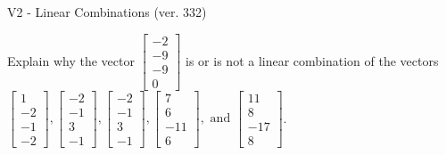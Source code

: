 \begin{exercise}
  \begin{exerciseTitle}V2 - Linear Combinations (ver. 332)\end{exerciseTitle}
  \begin{exerciseStatement}
    Explain why the vector \(\left[\begin{array}{c}
-2 \\
-9 \\
-9 \\
0
\end{array}\right]\)  is or is not a linear 
	combination of the vectors \(\left[\begin{array}{c}
1 \\
-2 \\
-1 \\
-2
\end{array}\right] , \left[\begin{array}{c}
-2 \\
-1 \\
3 \\
-1
\end{array}\right] , \left[\begin{array}{c}
-2 \\
-1 \\
3 \\
-1
\end{array}\right] , \left[\begin{array}{c}
7 \\
6 \\
-11 \\
6
\end{array}\right] , \text{ and } \left[\begin{array}{c}
11 \\
8 \\
-17 \\
8
\end{array}\right]\).
	



\end{exerciseStatement}
\end{exercise}
